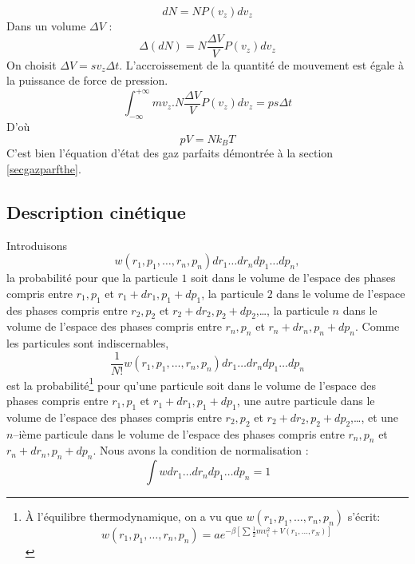 \documentclass[12pt]{book}
\begin{document}
\begin{equation}
dN=NP(v_z)dv_z
\end{equation}
Dans un volume $\Delta V$ :
\begin{equation}
\Delta(dN)=N\frac{\Delta V}{V}P(v_z)dv_z
\end{equation}
On choisit $\Delta V =s v_z \Delta t$.
L'accroissement de la quantit\'e de mouvement est \'egale \`a la
puissance de force de pression.
\begin{equation}
\int_{-\infty}^{+\infty}m v_z.N\frac{\Delta V}{V}P(v_z)dv_z=p s \Delta t
\end{equation}
D'o\`u
\begin{equation}
pV=Nk_BT
\end{equation}
C'est bien l'\'equation d'\'etat des gaz parfaits d\'emontr\'ee \`a la
section \ref{secgazparfthe}.
\subsection{Description cin\'etique}\label{secdesccinet}
Introduisons 
\begin{equation}
w(r_1,p_1,\dots,r_n,p_n)dr_1\dots dr_n dp_1\dots dp_n,
\end{equation}
la probabilit\'e pour que la particule $1$ soit dans le volume de
l'espace des phases compris entre $r_1,p_1$ et $r_1 +dr_1,p_1+dp_1$, la particule $2$ dans le volume de
l'espace des phases compris entre $r_2,p_2$ et $r_2 +dr_2,p_2+dp_2$,\dots,
la particule $n$ dans le volume de
l'espace des phases compris entre $r_n,p_n$ et $r_n +dr_n,p_n+dp_n$.
Comme les particules sont indiscernables,
\begin{equation}
\frac{1}{N!}w(r_1,p_1,\dots,r_n,p_n)dr_1\dots dr_n dp_1\dots dp_n
\end{equation}
est la probabilit\'e\footnote{\`A l'\'equilibre thermodynamique, on a
vu que  $w(r_1,p_1,\dots,r_n,p_n)$ s'\'ecrit:
\begin{equation}
w(r_1,p_1,\dots,r_n,p_n)=ae^{-\beta[\sum
\frac{1}{2}mv_i^2+V(r_1,\dots,r_N)]} 
\end{equation}
}%
pour qu'une particule  soit dans le volume de
l'espace des phases compris entre $r_1,p_1$ et $r_1 +dr_1,p_1+dp_1$,
une autre particule dans le volume de
l'espace des phases compris entre $r_2,p_2$ et $r_2 +dr_2,p_2+dp_2$,\dots,
et une $n$--i\`eme particule dans le volume de
l'espace des phases compris entre $r_n,p_n$ et $r_n +dr_n,p_n+dp_n$.
Nous avons la condition de normalisation :
\begin{equation}
\int w dr_1\dots dr_n dp_1\dots dp_n=1
\end{equation}
\end{document}
